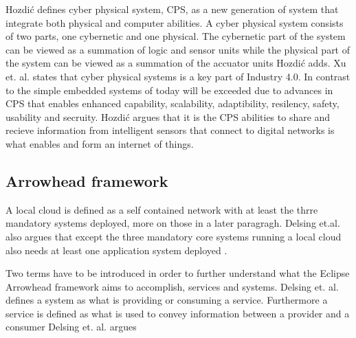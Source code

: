 Hozdić defines cyber physical system, CPS, as a new generation of system that integrate both physical and computer abilities. \cite{Hozdic2015}
A cyber physical system consists of two parts, one cybernetic and one physical.
The cybernetic part of the system can be viewed as a summation of logic and sensor units while the physical part of the system can be viewed as a summation of the accuator units Hozdić adds. \cite{Hozdic2015}
Xu et. al. states that cyber physical systems is a key part of Industry 4.0. In contrast to the simple embedded systems of today will be exceeded due to advances in CPS that enables enhanced capability, scalability, adaptibility, resilency, safety, usability and secruity.  \cite{Xu2018}
Hozdić argues that it is the CPS abilities to share and recieve information from intelligent sensors that connect to digital networks is what enables and form an internet of things. \cite{Hozdic2015}
 
\subsection{Arrowhead framework}
A local cloud is defined as a self contained network with at least the thrre mandatory systems deployed, more on those in a later paragragh. 
Delsing et.al. also argues that except the three mandatory core systems running a local cloud also needs at least one application system deployed \cite{Delsing2017}.

Two terms have to be introduced in order to further understand what the Eclipse Arrowhead framework aims to accomplish, services and systems.
Delsing et. al. defines a system as what is providing or consuming a service. \cite{Delsing2017} 
Furthermore a service is defined as what is used to convey information between a provider and a consumer Delsing et. al. argues \cite{Delsing2017}

